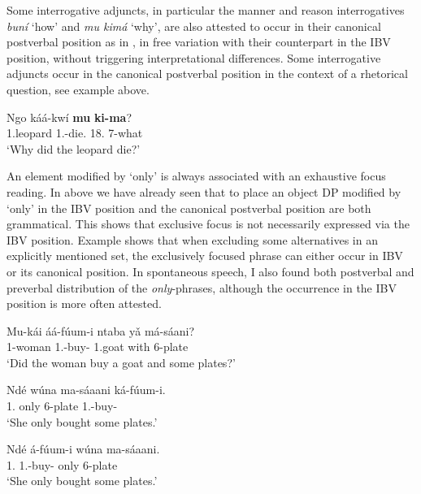 \documentclass[output=paper,colorlinks,citecolor=brown,
]{langscibook}
\begin{document}
Some interrogative adjuncts, in particular the manner and reason interrogatives \textit{bun\'{i}} `how' and \textit{mu kim\'{a}} `why', are also attested to occur in their canonical postverbal position as in , in free variation with their counterpart in the IBV position, without triggering interpretational differences. Some interrogative adjuncts occur in the canonical postverbal position in the context of a rhetorical question, see example  above.
\begin{exe} 
\ex
\label{27}
\gll
Ngo káá-kwí \textbf{mu} \textbf{ki-ma}?\\
1.leopard 1\Sm{}.\Pst{}-die.\Pst{} 18.\Loc{} 7-what\\
\trans ‘Why did the leopard die?'

    \end{exe}
An element modified by `only' is always associated with an exhaustive focus reading. In  above we have already seen that to place an object DP modified by `only' in the IBV position and the canonical postverbal position are both grammatical. This shows that exclusive focus is not necessarily expressed via the IBV position. Example  shows that when excluding some alternatives in an explicitly mentioned set, the exclusively focused phrase can either occur in IBV or its canonical position. In spontaneous speech, I also found both postverbal and preverbal distribution of the \textit{only}-phrases, although the occurrence in the IBV position is more often attested.
\begin{exe} 
    \ex \label{28}
    \begin{xlist}
\ex
\label{28a}
\gll
Mu-kái áá-fúum-i ntaba y\v{a} má-sáani?\\
1-woman 1\Sm{}.\Pst{}-buy-\Pst{} 1.goat with 6-plate\\
\trans ‘Did the woman buy a goat and some plates?’

\ex
\label{28b}
\gll
Nd\'{e} w\'{u}na ma-s\'{a}aani k\'{a}-fúum-i.\\
1.\Pro{} only 6-plate 1\Sm{}.\Pst{}-buy-\Pst{}\\
\trans ‘She only bought some plates.’

\ex
\label{28c}
\gll
Nd\'{e} \'{a}-fúum-i w\'{u}na ma-s\'{a}aani.\\
1.\Pro{} 1\Sm{}.\Pst{}-buy-\Pst{} only 6-plate\\
\trans ‘She only bought some plates.’

\end{xlist}
\end{exe}
\end{document}
